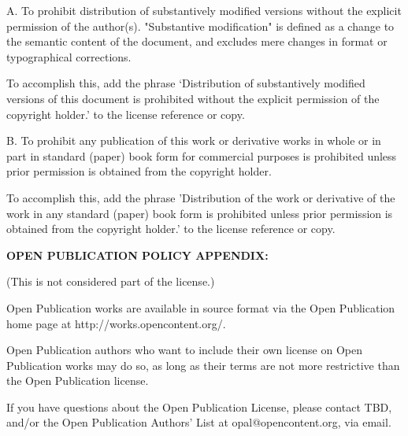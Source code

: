 A. To prohibit distribution of substantively modified versions without
the explicit permission of the author(s). "Substantive modification" is
defined as a change to the semantic content of the document, and
excludes mere changes in format or typographical corrections.

To accomplish this, add the phrase `Distribution of substantively
modified versions of this document is prohibited without the explicit
permission of the copyright holder.' to the license reference or copy.

B. To prohibit any publication of this work or derivative works in whole
or in part in standard (paper) book form for commercial purposes is
prohibited unless prior permission is obtained from the copyright
holder.

To accomplish this, add the phrase 'Distribution of the work or
derivative of the work in any standard (paper) book form is prohibited
unless prior permission is obtained from the copyright holder.' to the
license reference or copy.

{\bf OPEN PUBLICATION POLICY APPENDIX:}

(This is not considered part of the license.)

Open Publication works are available in source format via the Open
Publication home page at http://works.opencontent.org/.

Open Publication authors who want to include their own license on Open
Publication works may do so, as long as their terms are not more
restrictive than the Open Publication license.

If you have questions about the Open Publication License, please contact
TBD, and/or the Open Publication Authors' List at opal@opencontent.org,
via email.

\vspace*{\fill}

\newpage
